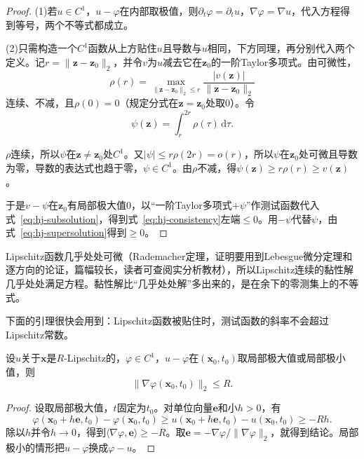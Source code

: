 \begin{proof}
(1)若$u\in C^1$，$u-\varphi$在内部取极值，则$\partial_t\varphi=\partial_tu$，$\nabla\varphi=\nabla u$，代入方程得到等号，两个不等式都成立。

(2)只需构造一个$C^1$函数从上方贴住$u$且导数与$u$相同，下方同理，再分别代入两个定义。记$r=\lVert\bm{z}-\bm{z}_0\rVert_2$，并令$v$为$u$减去它在$\bm{z}_0$的一阶Taylor多项式。由可微性，
\[
  \rho(r)=\max_{\lVert\bm{z}-\bm{z}_0\rVert_2\leq r}\frac{\lvert v(\bm{z})\rvert}{\lVert\bm{z}-\bm{z}_0\rVert_2}
\]
连续、不减，且$\rho(0)=0$（规定分式在$\bm{z}=\bm{z}_0$处取$0$）。令
\[
  \psi(\bm{z})=\int_r^{2r}\rho(\tau)\,\mathrm{d}\tau.
\]

$\rho$连续，所以$\psi$在$\bm{z}\neq\bm{z}_0$处$C^1$。又$\lvert\psi\rvert\leq r\rho(2r)=o(r)$，所以$\psi$在$\bm{z}_0$处可微且导数为零，导数的表达式也趋于零，$\psi\in C^1$。由$\rho$不减，得$\psi(\bm{z})\geq r\rho(r)\geq v(\bm{z})$。

于是$v-\psi$在$\bm{z}_0$有局部极大值$0$，以“一阶Taylor多项式$+\psi$”作测试函数代入式~\eqref{eq:hj-subsolution}，得到式~\eqref{eq:hj-consistency}左端$\leq0$。用$-\psi$代替$\psi$，由式~\eqref{eq:hj-supersolution}得到$\geq0$。
\end{proof}

Lipschitz函数几乎处处可微（Rademacher定理，证明要用到Lebesgue微分定理和逐方向的论证，篇幅较长，读者可查阅实分析教材），所以Lipschitz连续的黏性解几乎处处满足方程。黏性解比“几乎处处解”多出来的，是在余下的零测集上的不等式。

下面的引理很快会用到：Lipschitz函数被贴住时，测试函数的斜率不会超过Lipschitz常数。

\begin{lemma}[贴住Lipschitz函数]
\label{lem:hj-lipschitz-touch}
设$u$关于$\bm{x}$是$R$-Lipschitz的，$\varphi\in C^1$，$u-\varphi$在$(\bm{x}_0,t_0)$取局部极大值或局部极小值，则
\begin{equation}
  \lVert\nabla\varphi(\bm{x}_0,t_0)\rVert_2\leq R.
  \label{eq:hj-lipschitz-touch}
\end{equation}
\end{lemma}

\begin{proof}
设取局部极大值，$t$固定为$t_0$。对单位向量$\bm{e}$和小$h>0$，有
\[
  \varphi(\bm{x}_0+h\bm{e},t_0)-\varphi(\bm{x}_0,t_0)\geq u(\bm{x}_0+h\bm{e},t_0)-u(\bm{x}_0,t_0)\geq-Rh.
\]
除以$h$并令$h\to0$，得到$\langle\nabla\varphi,\bm{e}\rangle\geq-R$。取$\bm{e}=-\nabla\varphi/\lVert\nabla\varphi\rVert_2$，就得到结论。局部极小的情形把$u-\varphi$换成$\varphi-u$。
\end{proof}

